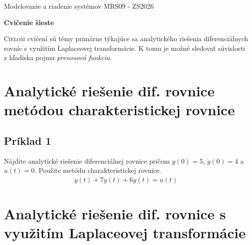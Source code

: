 \documentclass[a4paper, 10pt, ]{article}
\def\oznacenieCasti{MRS09 - ZS2026}
\begin{document}
\lstset{%
style=mystyle,
}






\fontsize{12pt}{22pt}\selectfont

\centerline{\textsf{Modelovanie a riadenie systémov} \hfill \textsf{\oznacenieCasti}}

\fontsize{18pt}{22pt}\selectfont





\begin{flushleft}
	\textbf{\textsf{Cvičenie šieste}}
\end{flushleft}






\normalsize

\bigskip

{\hypersetup{hidelinks}

\tableofcontents

}

\bigskip

\vspace{18pt}



\noindent
\lettrine[lines=3, nindent=0pt]{C}{ieľom} cvičení sú témy primárne týkajúce sa analytického riešenia diferenciálnych rovníc s využitím Laplaceovej transformácie. K tomu je možné sledovať súvislosti z hľadiska pojmu \emph{prenosová funkcia}.








\section{Analytické riešenie dif. rovnice metódou charakteristickej rovnice}

\subsection{Príklad 1}

Nájdite analytické riešenie diferenciálnej rovnice pričom $y(0) = 5$, $\dot y(0) = 4$ a $u(t) = 0$. Použite metódu charakteristickej rovnice.
\begin{align}
    \ddot y(t) + 7 \dot y(t) + 6 y(t) = u(t)
\end{align}






\section{Analytické riešenie dif. rovnice s využitím Laplaceovej transformácie}
\end{document}
